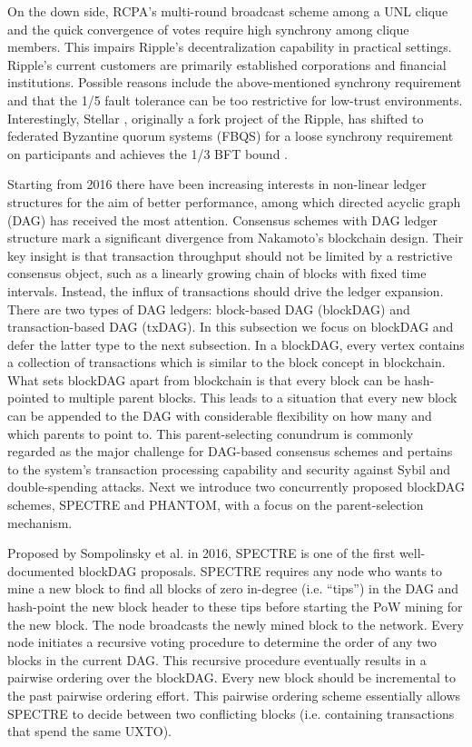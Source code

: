 On the down side, RCPA's multi-round broadcast scheme among a UNL clique and the quick convergence of votes require high synchrony among clique members. This impairs Ripple's decentralization capability in practical settings.
Ripple's current customers are primarily established corporations and financial institutions. Possible reasons include the above-mentioned synchrony requirement and that the 1/5 fault tolerance can be too restrictive for low-trust environments. Interestingly, Stellar , originally a fork project of the Ripple, 
{\color{\rcolor}
has shifted to federated Byzantine quorum systems (FBQS) for a loose synchrony requirement on participants and achieves the 1/3 BFT bound .
}

{\color{\rcolor}
Starting from 2016 there have been increasing interests in non-linear ledger structures for the aim of better performance, among which directed acyclic graph (DAG) has received the most attention.
Consensus schemes with DAG ledger structure mark a significant divergence from Nakamoto's blockchain design. Their key insight is that transaction throughput should not be limited by a restrictive consensus object, such as a linearly growing chain of blocks with fixed time intervals. Instead, the influx of transactions should drive the ledger expansion. There are two types of DAG ledgers: block-based DAG (blockDAG) and transaction-based DAG (txDAG). In this subsection we focus on blockDAG and defer the latter type to the next subsection. 
In a blockDAG, every vertex contains a collection of transactions which is similar to the block concept in blockchain. What sets blockDAG apart from blockchain is that every block can be hash-pointed to multiple parent blocks. This leads to a situation that every new block can be appended to the DAG with considerable flexibility on how many and which parents to point to. This parent-selecting conundrum is commonly regarded as the major challenge for DAG-based consensus schemes and pertains to the system's transaction processing capability and security against Sybil and double-spending attacks. Next we introduce two concurrently proposed blockDAG schemes, SPECTRE and PHANTOM, with a focus on the parent-selection mechanism.

Proposed by Sompolinsky et al.  in 2016, SPECTRE is one of the first well-documented blockDAG proposals. SPECTRE requires any node who wants to mine a new block to find all blocks of zero in-degree (i.e. ``tips'') in the DAG and hash-point the new block header to these tips before starting the PoW mining for the new block. The node broadcasts the newly mined block to the network. Every node initiates a recursive voting procedure to determine the order of any two blocks in the current DAG. This recursive procedure eventually results in a pairwise ordering over the blockDAG. Every new block should be incremental to the past pairwise ordering effort. This pairwise ordering scheme essentially allows SPECTRE to decide between two conflicting blocks (i.e. containing transactions that spend the same UXTO).

}
